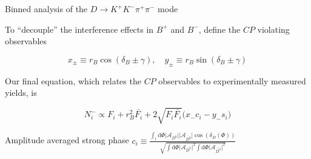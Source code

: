 \documentclass{beamer}
\begin{document}
\begin{frame}{Binned analysis of the $D\to K^+K^-\pi^+\pi^-$ mode}
  \begin{center}
    \Large To ``decouple'' the interference effects in $B^+$ and $B^-$, define the $C\!P$ violating observables
  \end{center}
  \vspace{-0.1cm}
  \begin{equation*}
    x_\pm\equiv r_B\cos(\delta_B\pm\gamma), \quad y_\pm\equiv r_B\sin(\delta_B\pm\gamma)
  \end{equation*}
  \begin{center}
    \Large Our final equation, which relates the $C\!P$ observables to experimentally measured yields, is
  \end{center}
  \begin{equation*}
    N_i^-\propto F_i + r_B^2\bar{F_i} + 2\sqrt{F_i\bar{F_i}}\big(x_-c_i - y_-s_i\big)
  \end{equation*}
  \vspace{-0.7cm}
  \begin{center}
    \begin{minipage}{6cm}
      \begin{block}{\centering Amplitude averaged strong phase}
        \centering
        $c_i\equiv\frac{\int_i\mathrm{d}\Phi\lvert\mathcal{A}_{D^0}\lvert\lvert\mathcal{A}_{\bar{D^0}}\lvert\cos(\delta_D(\Phi))}{\sqrt{\int\mathrm{d}\Phi\lvert\mathcal{A}_{D^0}\lvert^2\int\mathrm{d}\Phi\lvert\mathcal{A}_{\bar{D^0}}\lvert^2}}$
      \end{block}
    \end{minipage}
  \end{center}
\end{frame}
\end{document}
